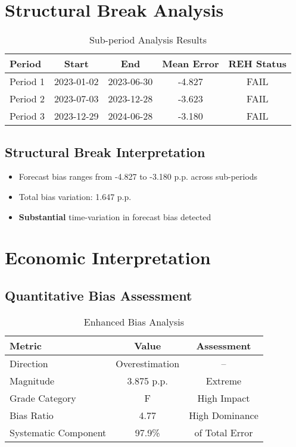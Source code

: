 \documentclass[11pt,a4paper]{article}
\begin{document}
\section{Structural Break Analysis}

\begin{table}[H]
\centering
\caption{Sub-period Analysis Results}
\begin{tabular}{lcccc}
\toprule
\textbf{Period} & \textbf{Start} & \textbf{End} & \textbf{Mean Error} & \textbf{REH Status} \\
\midrule
Period 1 & 2023-01-02 & 2023-06-30 & -4.827 & \textcolor{academicred}{FAIL} \\
Period 2 & 2023-07-03 & 2023-12-28 & -3.623 & \textcolor{academicred}{FAIL} \\
Period 3 & 2023-12-29 & 2024-06-28 & -3.180 & \textcolor{academicred}{FAIL} \\
\bottomrule
\end{tabular}
\end{table}

\subsection{Structural Break Interpretation}
\begin{itemize}
\item Forecast bias ranges from -4.827 to -3.180 p.p. across sub-periods
\item Total bias variation: 1.647 p.p.
\item \textbf{Substantial} time-variation in forecast bias detected
\end{itemize}

\section{Economic Interpretation}

\subsection{Quantitative Bias Assessment}
\begin{table}[H]
    \centering
    \caption{Enhanced Bias Analysis}
    \begin{tabular}{lcc}
        \toprule
        \textbf{Metric}      & \textbf{Value} & \textbf{Assessment} \\
        \midrule
        Direction            & Overestimation & --                  \\
        Magnitude            & 3.875 p.p.     & Extreme             \\
        Grade Category       & F              & High Impact         \\
        Bias Ratio           & 4.77           & High Dominance      \\
        Systematic Component & 97.9\%         & of Total Error      \\
        \bottomrule
    \end{tabular}
\end{table}
\end{document}

